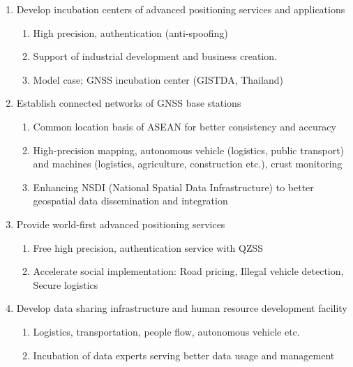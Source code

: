 \begin{enumerate}

\item Develop incubation centers of advanced positioning services and applications

\begin{enumerate}
\item High precision, authentication (anti-spoofing)
\item Support of industrial development and business creation.
\item Model case; GNSS incubation center (GISTDA, Thailand)
\end{enumerate}

\item Establish connected networks of GNSS base stations

\begin{enumerate}
\item Common location basis of ASEAN for better consistency and accuracy
\item High-precision mapping, autonomous vehicle (logistics, public transport) and machines (logistics, agriculture, construction etc.), crust monitoring
\item Enhancing NSDI (National Spatial Data Infrastructure) to better geospatial data dissemination and integration
\end{enumerate}

\item Provide world-first advanced positioning services

\begin{enumerate}
\item Free high precision, authentication service with QZSS
\item Accelerate social implementation: Road pricing, Illegal vehicle detection, Secure logistics
\end{enumerate}

\item Develop data sharing infrastructure and human resource development facility

\begin{enumerate}
\item Logistics, transportation, people flow, autonomous vehicle etc.
\item Incubation of data experts serving better data usage and management
\end{enumerate}

\end{enumerate}


